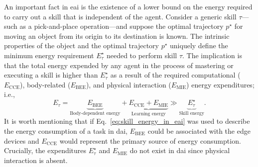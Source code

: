 \documentclass[12pt]{article}
\begin{document}
An important fact in \ac{eai} is the existence of a lower bound on the energy required to carry out a skill that is independent of the agent. Consider a generic skill $\tau$---such as a pick-and-place operation---and suppose the optimal trajectory $p^\star$ for moving an object from its origin to its destination is known. The intrinsic properties of the object and the optimal trajectory $p^\star$ uniquely define the minimum energy requirement $E^\star_{\tau}$ needed to perform skill $\tau$. The implication is that the total energy expended by any agent in the process of mastering or executing a skill is higher than $E^\star_{\tau}$ as a result of the required computational ($E_\text{CCE}$), body-related ($E_\text{BEE}$), and physical interaction ($E_\text{MIE}$) energy expenditures; i.e.,
\begin{equation}\label{eq:skill_energy_in_eai}
	E_{\tau} =  \underbrace{E_\text{BEE}}_{\text{Body-dependent energy}} + \underbrace{E_\text{CCE} + E_\text{MIE}}_{\text{Learning energy}} \gg \underbrace{E^\star_{\tau}}_{\text{Skill energy}} .
\end{equation}
It is worth mentioning that if Eq.~\eqref{eq:skill_energy_in_eai} was used to describe the energy consumption of a task in \ac{dai}, $E_\text{BEE}$ could be associated with the edge devices and $E_\text{CCE}$ would represent the primary source of energy consumption. Crucially, the expenditures $E^\star_{\tau}$ and $E_\text{MIE}$ do not exist in \ac{dai} since physical interaction is absent.

\end{document}
